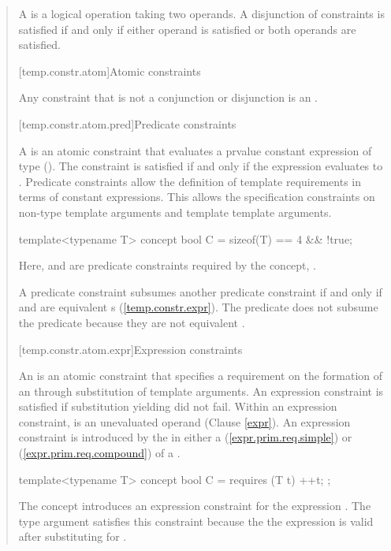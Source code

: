 \begin{quote}
\pnum
A  is a logical operation taking two 
operands. A disjunction of constraints is satisfied if and only 
if either operand is satisfied or both operands are satisfied.

[temp.constr.atom]{Atomic constraints}

Any constraint that is not a conjunction or disjunction is an
.

[temp.constr.atom.pred]{Predicate constraints}

\pnum
A  is an atomic constraint
that evaluates a prvalue constant expression of type 
().
% 
The constraint is satisfied if and only if the expression 
evaluates to .
% 
\enternote
Predicate constraints allow the definition of template requirements
in terms of constant expressions. This allows the specification 
constraints on non-type template arguments and template template 
arguments.
\exitnote
% 
\enterexample
\begin{codeblock}
template<typename T> concept bool C = sizeof(T) == 4 && !true;
\end{codeblock}
Here,  and  are 
predicate constraints required by the concept, .
\exitexample

\pnum
A predicate constraint  subsumes another predicate constraint 
 if and only if  and  are equivalent 
s (\ref{temp.constr.expr}).
% 
\enterexample
The predicate  does not subsume the predicate
 because they are not equivalent
.
\exitexample



[temp.constr.atom.expr]{Expression constraints}

\pnum
An  is an atomic constraint
that specifies a requirement on the formation of an
 
through substitution of template arguments.
% 
An expression constraint is satisfied if substitution 
yielding  did not fail. 
% 
Within an expression constraint,  is an unevaluated 
operand (Clause \ref{expr}).
% 
\enternote
An expression constraint is introduced by the  in 
either a  (\ref{expr.prim.req.simple})
or  (\ref{expr.prim.req.compound})
of a .
\exitnote
% 
\enterexample
\begin{codeblock}
template<typename T> concept bool C = requires (T t) { ++t; };
\end{codeblock}
The concept  introduces an expression constraint for 
the expression .
% 
The type argument  satisfies this constraint because the
the expression  is valid after substituting 
for .
\exitexample


\end{quote}
